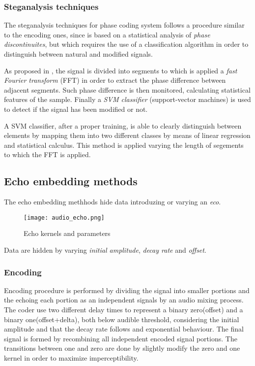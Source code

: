 \documentclass[../../main.tex]{subfiles}
\begin{document}
\subsubsection{Steganalysis techniques}
The steganalysis techniques for phase coding system follows a
procedure similar to the encoding ones, since is based on a statistical
analysis of \emph{phase discontinuites}, but which requires the use of a
classification algorithm in order to distinguish between natural and
modified signals.

As proposed in \cite{steganalysis-phase-coding}, the signal is divided into segments to which is applied a
\emph{fast Fourier transform} (FFT) in order to extract the phase difference between adjacent segments.
Such phase difference is then monitored, calculating statistical features of the sample. Finally a \emph{SVM classifier} (support-vector machines) is used to
 detect if the signal has been modified or not.

A SVM classifier, after a proper training, is able to clearly distinguish
between elements by mapping them into two different classes by means of
linear regression and statistical calculus.
This method is applied varying the length of segements to which the FFT is
applied.

\subsection{Echo embedding methods}
The echo embedding methhods hide data introduzing or varying an \emph{eco}.
\begin{figure}[h]
    \centering
    \caption{Echo kernels and parameters}
    \texttt{[image: audio\_echo.png]}
\end{figure}
Data are hidden by varying \emph{initial amplitude}, \emph{decay rate} and
\emph{offset}.
\subsubsection{Encoding}
Encoding procedure is performed by dividing the signal into smaller
portions and the echoing each portion as an independent signals by an audio
mixing process.
The coder use two different delay times to represent a binary zero(offset)
and a binary one(offset+delta), both below audible threshold, considering
the initial amplitude and that the decay rate follows and exponential
behaviour.
The final signal is formed by recombining all independent encoded signal
portions.
The transitions between one and zero are done by slightly modify the zero
and one kernel in order to maximize imperceptibility.
\end{document}
